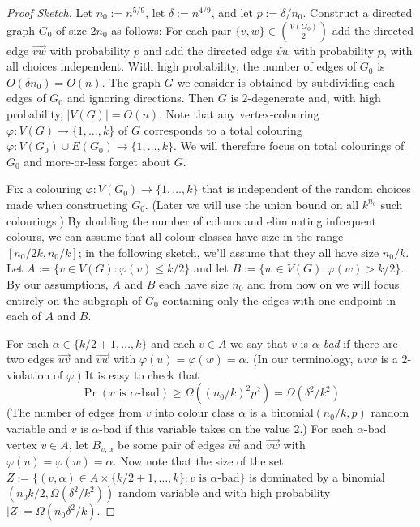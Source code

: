 \documentclass{patmorin}
\newcommand{\defin}[1]{\emph{\color{brightmaroon}#1}}
\begin{document}
\begin{proof}[Proof Sketch]
  Let $n_0:=n^{5/9}$, let $\delta:=n^{4/9}$, and let $p:=\delta/n_0$. Construct a directed graph $G_0$ of size $2n_0$ as follows:  For each pair $\{v,w\}\in \binom{V(G_0)}{2}$ add the directed edge $\overrightarrow{vw}$ with probability $p$ and add the directed edge $\overleftarrow{vw}$ with probability $p$, with all choices independent.  With high probability, the number of edges of $G_0$ is $O(\delta n_0)=O(n)$.  The graph $G$ we consider is obtained by subdividing each edges of $G_0$ and ignoring directions. Then $G$ is $2$-degenerate and, with high probability, $|V(G)|=O(n)$. Note that any vertex-colouring $\varphi:V(G)\to\{1,\ldots,k\}$ of $G$ corresponds to a total colouring $\varphi:V(G_0)\cup E(G_0)\to\{1,\ldots,k\}$.  We will therefore focus on total colourings of $G_0$ and more-or-less forget about $G$.

  Fix a colouring $\varphi:V(G_0)\to\{1,\ldots,k\}$ that is independent of the random choices made when constructing $G_0$.  (Later we will use the union bound on all $k^{n_0}$ such colourings.)  By doubling the number of colours and eliminating infrequent colours, we can assume that all colour classes have size in the range $[n_0/2k,n_0/k]$; in the following sketch, we'll assume that they all have size $n_0/k$.  Let $A:=\{v\in V(G):\varphi(v)\le k/2\}$ and let $B:=\{w\in V(G):\varphi(w)> k/2\}$.  By our assumptions, $A$ and $B$ each have size $n_0$ and from now on we will focus entirely on the subgraph of $G_0$ containing only the edges with one endpoint in each of $A$ and $B$.

  For each $\alpha\in\{k/2+1,\ldots,k\}$ and each $v\in A$ we say that $v$ is \defin{$\alpha$-bad} if there are two edges $\overrightarrow{uv}$ and $\overrightarrow{vw}$ with $\varphi(u)=\varphi(w)=\alpha$.  (In our terminology, $uvw$ is a $2$-violation of $\varphi$.)  It is easy to check that
  \[
    \Pr(\text{$v$ is $\alpha$-bad}) \ge \Omega((n_0/k)^2p^2) = \Omega(\delta^2/k^2)
  \]
  (The number of edges from $v$ into colour class $\alpha$ is a binomial$(n_0/k,p)$ random variable and $v$ is $\alpha$-bad if this variable takes on the value $2$.)  For each $\alpha$-bad vertex $v\in A$, let $B_{v,\alpha}$ be some pair of edges $\overrightarrow{vu}$ and $\overrightarrow{vw}$ with $\varphi(u)=\varphi(w)=\alpha$.  Now note that the size of the set $Z:=\{(v,\alpha)\in A\times\{k/2+1,\ldots,k\}: \text{$v$ is $\alpha$-bad}\}$ is dominated by a binomial$(n_0 k/2,\Omega(\delta^2/k^2))$ random variable and with high probability $|Z|=\Omega(n_0\delta^2/k)$.


\end{proof}
\end{document}

